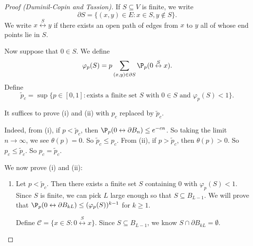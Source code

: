 \documentclass[a4paper]{article}
\begin{document}
\begin{proof}[Proof (Duminil-Copin and Tassion)]
  If $S \subseteq V$ is finite, we write
  \[
    \partial S = \{(x, y) \in E: x \in S, y \not \in S\}.
  \]
  We write $x \overset{S}{\leftrightarrow} y$ if there exists an open path of edges from $x$ to $y$ all of whose end points lie in $S$.

  Now suppose that $0 \in S$. We define
  \[
    \varphi_p(S) = p \sum_{(x, y) \in \partial S} \P_p(0 \overset{S}{\leftrightarrow} x).
  \]
  Define
  \[
    \tilde{p}_c = \sup \{p \in [0, 1]: \text{exists a finite set $S$ with $0 \in S$ and $\varphi_p(S) < 1$}\}.
  \]
  \begin{claim}
    It suffices to prove (i) and (ii) with $p_c$ replaced by $\tilde{p}_c$.
  \end{claim}

  Indeed, from (i), if $p < \tilde{p}_c$, then $\P_p(0 \leftrightarrow \partial B_n) \leq e^{-cn}$. So taking the limit $n \to \infty$, we see $\theta(p) = 0$. So $\tilde{p}_c \leq p_c$. From (ii), if $p > \tilde{p}_c$, then $\theta(p) > 0$. So $p_c \leq \tilde{p}_c$. So $p_c = \tilde{p}_c$.

  We now prove (i) and (ii):
  \begin{enumerate}
    \item Let $p < \tilde{p}_c$. Then there exists a finite set $S$ containing $0$ with $\varphi_p(S) < 1$. Since $S$ is finite, we can pick $L$ large enough so that $S \subseteq B_{L - 1}$. We will prove that $\P_p(0 \leftrightarrow \partial B_{kL}) \leq (\varphi_p(S))^{k - 1}$ for $k \geq 1$.

      Define $\mathcal{C} = \{x \in S: 0 \overset{S}{\leftrightarrow} x\}$. Since $S \subseteq B_{L - 1}$, we know $S \cap \partial B_{kL} = \emptyset$.


\end{enumerate}
\end{proof}
\end{document}

